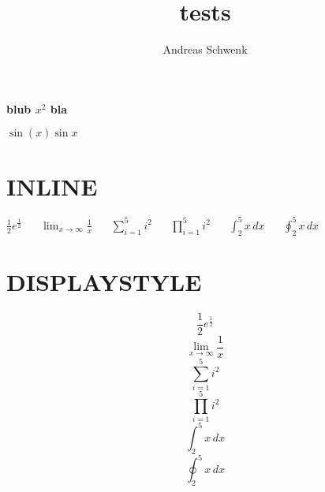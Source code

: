 \documentclass[10pt,a5paper]{article}
\author{Andreas Schwenk}
\title{tests}
\begin{document}
\textbf{blub $x^2$ bla}	

$\sin(x) \sin x$
	
	
\section*{INLINE}
$\frac12 e^{\frac12}$
~~
$\lim_{x\to\infty}\frac1x$
~~
$\sum_{i=1}^5 i^2$
~~
$\prod_{i=1}^5 i^2$
~~
$\int_2^5 x \, dx$
~~
$\oint_2^5 x \, dx$

\section*{DISPLAYSTYLE}
$$\frac12 e^{\frac12}$$
$$\lim_{x\to\infty}\frac1x$$
$$\sum_{i=1}^5 i^2$$
$$\prod_{i=1}^5 i^2$$
$$\int_2^5 x \, dx$$
$$\oint_2^5 x \, dx$$
	
\end{document}

